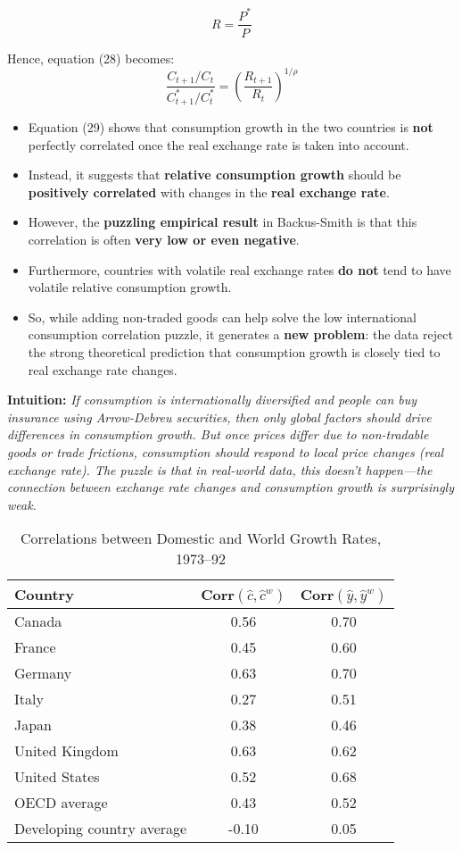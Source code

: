 \documentclass[12pt]{article}
\begin{document}
\[
R = \frac{P^*}{P}
\]

Hence, equation (28) becomes:
\begin{equation}
\frac{C_{t+1}/C_t}{C_{t+1}^*/C_t^*} = \left( \frac{R_{t+1}}{R_t} \right)^{1/\rho} \tag{29}
\end{equation}

\begin{itemize}
    \item Equation (29) shows that consumption growth in the two countries is \textbf{not} perfectly correlated once the real exchange rate is taken into account.
    \item Instead, it suggests that \textbf{relative consumption growth} should be \textbf{positively correlated} with changes in the \textbf{real exchange rate}.
    \item However, the \textbf{puzzling empirical result} in Backus-Smith is that this correlation is often \textbf{very low or even negative}.
    \item Furthermore, countries with volatile real exchange rates \textbf{do not} tend to have volatile relative consumption growth.
    \item So, while adding non-traded goods can help solve the low international consumption correlation puzzle, it generates a \textbf{new problem}: the data reject the strong theoretical prediction that consumption growth is closely tied to real exchange rate changes.
\end{itemize}

\vspace{1em}
\textbf{Intuition:} \textit{If consumption is internationally diversified and people can buy insurance using Arrow-Debreu securities, then only global factors should drive differences in consumption growth. But once prices differ due to non-tradable goods or trade frictions, consumption should respond to local price changes (real exchange rate). The puzzle is that in real-world data, this doesn’t happen—the connection between exchange rate changes and consumption growth is surprisingly weak.}

\begin{table}[H]
\centering
\begin{tabular}{lcc}
\textbf{Country} & \textbf{Corr}\((\hat{c}, \hat{c}^w)\) & \textbf{Corr}\((\hat{y}, \hat{y}^w)\) \\
\hline
Canada         & 0.56 & 0.70 \\
France         & 0.45 & 0.60 \\
Germany        & 0.63 & 0.70 \\
Italy          & 0.27 & 0.51 \\
Japan          & 0.38 & 0.46 \\
United Kingdom & 0.63 & 0.62 \\
United States  & 0.52 & 0.68 \\
\hline
OECD average           & 0.43 & 0.52 \\
Developing country average & -0.10 & 0.05 \\
\end{tabular}
\caption{Correlations between Domestic and World Growth Rates, 1973--92}
\end{table}
\end{document}
